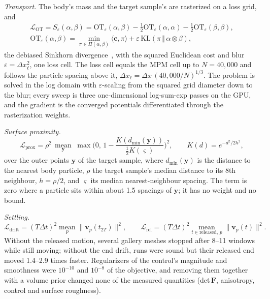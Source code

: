 \textit{Transport.} The body's mass and the target sample's are rasterized on a loss grid, and
\begin{equation}
\begin{gathered}
\mathcal{L}_{\mathrm{OT}}=S_\varepsilon(\alpha,\beta)=\mathrm{OT}_\varepsilon(\alpha,\beta)
 -\tfrac12\mathrm{OT}_\varepsilon(\alpha,\alpha)-\tfrac12\mathrm{OT}_\varepsilon(\beta,\beta),\\
\mathrm{OT}_\varepsilon(\alpha,\beta)=\min_{\pi\in\Pi(\alpha,\beta)}\langle\mathbf{c},\pi\rangle
 +\varepsilon\,\mathrm{KL}(\pi\,\Vert\,\alpha\otimes\beta),
\end{gathered}
\end{equation}
the debiased Sinkhorn divergence~\citep{feydy2019sinkhorn}, with the squared Euclidean cost and blur
$\varepsilon=\Delta x_\ell^2$, one loss cell. The loss cell equals the MPM cell up to $N=40{,}000$ and follows the particle
spacing above it, $\Delta x_\ell=\Delta x\,(40{,}000/N)^{1/3}$. The problem is solved in the log domain with
$\varepsilon$-scaling from the squared grid diameter down to the blur; every sweep is three one-dimensional log-sum-exp
passes on the GPU, and the gradient is the converged potentials differentiated through the rasterization weights.

\textit{Surface proximity.}
\begin{equation}
\mathcal{L}_{\mathrm{prox}}=\rho^2\,\operatorname*{mean}_{\mathbf{y}}\;
 \max\!\Big(0,\,1-\frac{K(d_{\min}(\mathbf{y}))}{\tfrac12K(\varsigma)}\Big)^{2},
 \qquad K(d)=e^{-d^2/2h^2},
\end{equation}
over the outer points $\mathbf{y}$ of the target sample, where $d_{\min}(\mathbf{y})$ is the distance to the nearest body
particle, $\rho$ the target sample's median distance to its 8th neighbour, $h=\rho/2$, and $\varsigma$ its median
nearest-neighbour spacing. The term is zero where a particle sits within about 1.5 spacings of $\mathbf{y}$; it has no
weight and no bound.

\textit{Settling.}
\begin{equation}
\mathcal{L}_{\mathrm{drift}}=(T\Delta t)^2\operatorname*{mean}_p\lVert\mathbf{v}_p(t_{2T})\rVert^2 ,\qquad
\mathcal{L}_{\mathrm{rel}}=(T\Delta t)^2\operatorname*{mean}_{t\in\text{released},\,p}\lVert\mathbf{v}_p(t)\rVert^2 .
\end{equation}
Without the released motion, several gallery meshes stopped after 8--11 windows while still moving; without the end drift,
runs were sound but their released end moved 1.4--2.9 times faster. Regularizers of the control's magnitude and
smoothness were $10^{-10}$ and $10^{-8}$ of the objective, and removing them together with a volume prior changed none of
the measured quantities (det\,$\mathbf{F}$, anisotropy, control and surface roughness).

